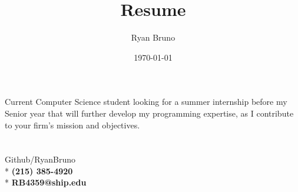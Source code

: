 \documentclass{article}
\title{Resume}
\author{Ryan Bruno}
\date{\today}
\renewcommand{\maketitle}{\Huge\textbf{\theauthor}}
\begin{document}
\begin{multicols}{2}
\maketitle

    {
        \footnotesize
        \renewcommand{\familydefault}{opensans}
        Current Computer Science student looking for a summer internship before my Senior year that will further develop my programming expertise, as I contribute to your firm’s mission and objectives.

    }

\columnbreak
\section*{}

    {
        \footnotesize
        \renewcommand{\familydefault}{opensans}
        Github/RyanBruno \\*
        \textbf{(215) 385-4920} \\*
        \textbf{RB4359@ship.edu}

    }
\end{multicols}
\end{document}
